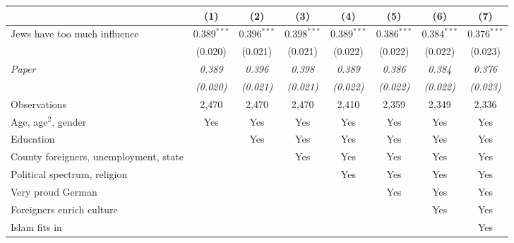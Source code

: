\begin{tabular}{lccccccc}
\toprule
 & (1) & (2) & (3) & (4) & (5) & (6) & (7) \\
\midrule
Jews have too much influence & $0.389^{***}$ & $0.396^{***}$ & $0.398^{***}$ & $0.389^{***}$ & $0.386^{***}$ & $0.384^{***}$ & $0.376^{***}$ \\
 & (0.020) & (0.021) & (0.021) & (0.022) & (0.022) & (0.022) & (0.023) \\
\textit{Paper} & \textit{0.389} & \textit{0.396} & \textit{0.398} & \textit{0.389} & \textit{0.386} & \textit{0.384} & \textit{0.376} \\
 & \textit{(0.020)} & \textit{(0.021)} & \textit{(0.021)} & \textit{(0.022)} & \textit{(0.022)} & \textit{(0.022)} & \textit{(0.023)} \\
\midrule
Observations & 2,470 & 2,470 & 2,470 & 2,410 & 2,359 & 2,349 & 2,336 \\
Age, age$^2$, gender & Yes & Yes & Yes & Yes & Yes & Yes & Yes \\
Education &  & Yes & Yes & Yes & Yes & Yes & Yes \\
County foreigners, unemployment, state &  &  & Yes & Yes & Yes & Yes & Yes \\
Political spectrum, religion &  &  &  & Yes & Yes & Yes & Yes \\
Very proud German &  &  &  &  & Yes & Yes & Yes \\
Foreigners enrich culture &  &  &  &  &  & Yes & Yes \\
Islam fits in &  &  &  &  &  &  & Yes \\
\bottomrule
\end{tabular}

